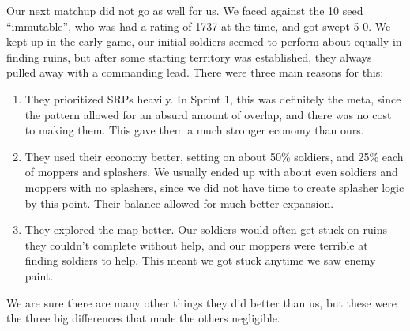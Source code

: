   Our next matchup did not go as well for us. We faced against the 10 seed ``immutable'', who was had a rating of 1737 at the time, and got swept 5-0. We kept up in the early game, our initial soldiers seemed to perform about equally in finding ruins, but after some starting territory was established, they always pulled away with a commanding lead. There were three main reasons for this:
  \begin{enumerate}
    \item They prioritized SRPs heavily. In Sprint 1, this was definitely the meta, since the pattern allowed for an absurd amount of overlap, and there was no cost to making them. This gave them a much stronger economy than ours.
    \item They used their economy better, setting on about 50\% soldiers, and 25\% each of moppers and splashers. We usually ended up with about even soldiers and moppers with no splashers, since we did not have time to create splasher logic by this point. Their balance allowed for much better expansion.
    \item They explored the map better. Our soldiers would often get stuck on ruins they couldn't complete without help, and our moppers were terrible at finding soldiers to help. This meant we got stuck anytime we saw enemy paint.
  \end{enumerate}
  We are sure there are many other things they did better than us, but these were the three big differences that made the others negligible.